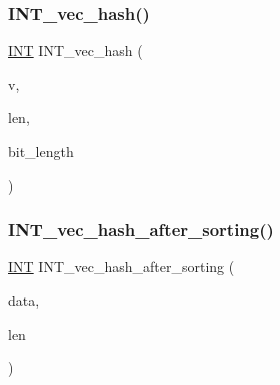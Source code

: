 \mbox{\label{util_8_c_a00e15ed1e145e14614c4875a49451a43}} 
\subsubsection{\texorpdfstring{I\+N\+T\+\_\+vec\+\_\+hash()}{INT\_vec\_hash()}\hspace{0.1cm}{\footnotesize\ttfamily [2/2]}}
{\footnotesize\ttfamily \mbox{\hyperlink{galois_8h_a09fddde158a3a20bd2dcadb609de11dc}{I\+NT}} I\+N\+T\+\_\+vec\+\_\+hash (\begin{DoxyParamCaption}\item[{\mbox{\hyperlink{galois_8h_a09fddde158a3a20bd2dcadb609de11dc}{I\+NT}} $\ast$}]{v,  }\item[{\mbox{\hyperlink{galois_8h_a09fddde158a3a20bd2dcadb609de11dc}{I\+NT}}}]{len,  }\item[{\mbox{\hyperlink{galois_8h_a09fddde158a3a20bd2dcadb609de11dc}{I\+NT}}}]{bit\+\_\+length }\end{DoxyParamCaption})}

\mbox{\label{util_8_c_aeafeac33912863498dad1e3c222d54b7}} 
\subsubsection{\texorpdfstring{I\+N\+T\+\_\+vec\+\_\+hash\+\_\+after\+\_\+sorting()}{INT\_vec\_hash\_after\_sorting()}}
{\footnotesize\ttfamily \mbox{\hyperlink{galois_8h_a09fddde158a3a20bd2dcadb609de11dc}{I\+NT}} I\+N\+T\+\_\+vec\+\_\+hash\+\_\+after\+\_\+sorting (\begin{DoxyParamCaption}\item[{\mbox{\hyperlink{galois_8h_a09fddde158a3a20bd2dcadb609de11dc}{I\+NT}} $\ast$}]{data,  }\item[{\mbox{\hyperlink{galois_8h_a09fddde158a3a20bd2dcadb609de11dc}{I\+NT}}}]{len }\end{DoxyParamCaption})}

\mbox{\label{util_8_c_aa44942d0ade0e10dafd2ff1a86e672b8}} 
